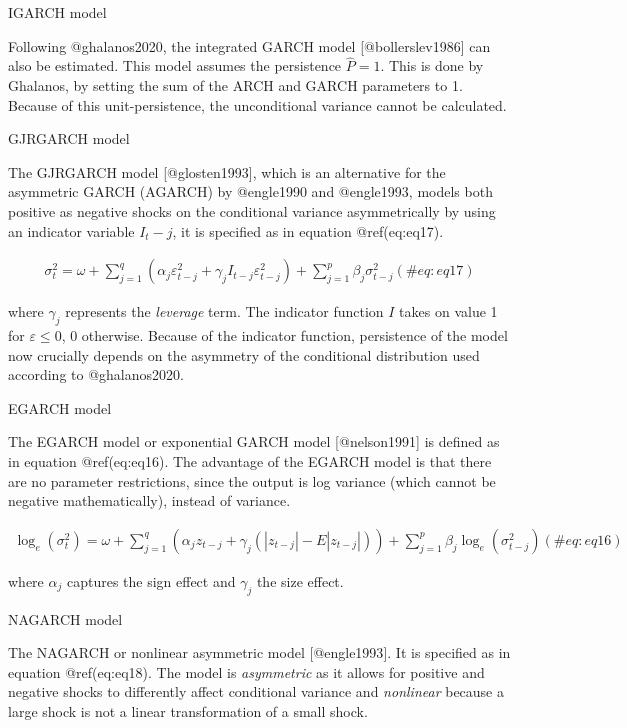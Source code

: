 \documentclass[
]{article}
\begin{document}
IGARCH model

\noindent Following @ghalanos2020, the integrated GARCH model
{[}@bollerslev1986{]} can also be estimated. This model assumes the
persistence \(\hat{P} = 1\). This is done by Ghalanos, by setting the
sum of the ARCH and GARCH parameters to 1. Because of this
unit-persistence, the unconditional variance cannot be calculated.

GJRGARCH model

\noindent The GJRGARCH model {[}@glosten1993{]}, which is an alternative
for the asymmetric GARCH (AGARCH) by @engle1990 and @engle1993, models
both positive as negative shocks on the conditional variance
asymmetrically by using an indicator variable \(I_t-j\), it is specified
as in equation @ref(eq:eq17).

\begin{align}
\sigma_t^2 = \omega + \sum\limits_{j=1}^q (\alpha_j \varepsilon_{t-j}^2 + \gamma_j I_{t-j} \varepsilon_{t-j}^2) + \sum\limits_{j = 1}^p \beta_j \sigma_{t-j}^2
 (\#eq:eq17)
\end{align}

\noindent where \(\gamma_j\) represents the \emph{leverage} term. The
indicator function \(I\) takes on value 1 for \(\varepsilon \le 0\), 0
otherwise. Because of the indicator function, persistence of the model
now crucially depends on the asymmetry of the conditional distribution
used according to @ghalanos2020.

EGARCH model

\noindent The EGARCH model or exponential GARCH model {[}@nelson1991{]}
is defined as in equation @ref(eq:eq16). The advantage of the EGARCH
model is that there are no parameter restrictions, since the output is
log variance (which cannot be negative mathematically), instead of
variance.

\begin{align}
\log_e(\sigma_t^2) = \omega + \sum\limits_{j=1}^q (\alpha_j z_{t-j} + \gamma_j (|z_{t-j}| - E|z_{t-j}|))+ \sum\limits_{j = 1}^p \beta_j \log_e(\sigma_{t-j}^2)
 (\#eq:eq16)
\end{align}

\noindent where \(\alpha_j\) captures the sign effect and \(\gamma_j\)
the size effect.

NAGARCH model

\noindent The NAGARCH or nonlinear asymmetric model {[}@engle1993{]}. It
is specified as in equation @ref(eq:eq18). The model is
\emph{asymmetric} as it allows for positive and negative shocks to
differently affect conditional variance and \emph{nonlinear} because a
large shock is not a linear transformation of a small shock.
\end{document}
